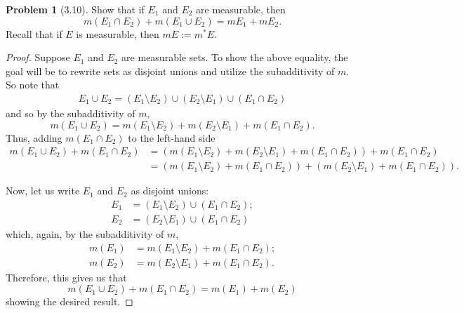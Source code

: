 \documentclass[12pt]{article}
\theoremstyle{definition}
\newtheorem{problem}{Problem}
\begin{document}
\begin{problem}[3.10]

    Show that if \( E_1 \) and \( E_2 \) are measurable, then 
        \[
            m(E_1 \cap  E_2) + m(E_1 \cup E_2) = mE_1 + mE_2.
        \]
    Recall that if \( E \) is measurable, then \( mE := m^{*} E \).

        \begin{proof}
            
            Suppose \( E_1 \) and \( E_2 \) are measurable sets. To show the above equality, the goal will be to rewrite sets as disjoint unions and utilize the subadditivity of \( m \). So note that 
                \begin{align*}
                    E_1 \cup E_2 = (E_1 \setminus E_2) \cup (E_2 \setminus E_1) \cup (E_1 \cap E_2)
                \end{align*}
            and so by the subadditivity of \( m \),
                \[
                    m(E_1 \cup E_2) = m(E_1 \setminus E_2) + m(E_2 \setminus E_1) + m(E_1 \cap E_2).
                \]
            Thus, adding \( m(E_1 \cap E_2) \) to the left-hand side
                \begin{align*}
                    m(E_1 \cup E_2) + m(E_1 \cap E_2) &= (m(E_1 \setminus E_2) + m(E_2 \setminus E_1) + m(E_1 \cap E_2)) + m(E_1 \cap E_2) \\
                                                      &= (m(E_1 \setminus E_2) +  m(E_1 \cap E_2)) + (m(E_2 \setminus E_1) + m(E_1 \cap E_2)).
                \end{align*}

            Now, let us write \( E_1 \) and \( E_2 \) as disjoint unions:
                \begin{align*}
                    E_1 &= (E_1 \setminus E_2) \cup (E_1 \cap E_2); \\
                    E_2 &= (E_2 \setminus E_1) \cup (E_1 \cap E_2)
                \end{align*}
            which, again, by the subadditivity of \( m \),
                \begin{align*}
                    m(E_1) &= m(E_1 \setminus E_2) + m(E_1 \cap E_2); \\
                    m(E_2) &= m(E_2 \setminus E_1) + m(E_1 \cap E_2).
                \end{align*}
            Therefore, this gives us that 
                \[
                    m(E_1 \cup E_2) + m(E_1 \cap E_2) = m(E_1) + m(E_2)
                \]
            showing the desired result.
        \end{proof}
    
\end{problem}
\end{document}
